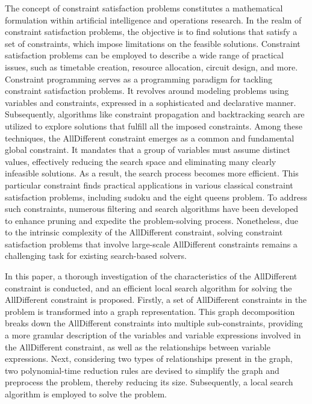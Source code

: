 The concept of constraint satisfaction problems constitutes a mathematical formulation within artificial intelligence and operations research. In the realm of constraint satisfaction problems, the objective is to find solutions that satisfy a set of constraints, which impose limitations on the feasible solutions. Constraint satisfaction problems can be employed to describe a wide range of practical issues, such as timetable creation, resource allocation, circuit design, and more. Constraint programming serves as a programming paradigm for tackling constraint satisfaction problems. It revolves around modeling problems using variables and constraints, expressed in a sophisticated and declarative manner. Subsequently, algorithms like constraint propagation and backtracking search are utilized to explore solutions that fulfill all the imposed constraints. Among these techniques, the AllDifferent constraint emerges as a common and fundamental global constraint. It mandates that a group of variables must assume distinct values, effectively reducing the search space and eliminating many clearly infeasible solutions. As a result, the search process becomes more efficient. This particular constraint finds practical applications in various classical constraint satisfaction problems, including sudoku and the eight queens problem. To address such constraints, numerous filtering and search algorithms have been developed to enhance pruning and expedite the problem-solving process. Nonetheless, due to the intrinsic complexity of the AllDifferent constraint, solving constraint satisfaction problems that involve large-scale AllDifferent constraints remains a challenging task for existing search-based solvers.

In this paper, a thorough investigation of the characteristics of the AllDifferent constraint is conducted, and an efficient local search algorithm for solving the AllDifferent constraint is proposed. Firstly, a set of AllDifferent constraints in the problem is transformed into a graph representation. This graph decomposition breaks down the AllDifferent constraints into multiple sub-constraints, providing a more granular description of the variables and variable expressions involved in the AllDifferent constraint, as well as the relationships between variable expressions. Next, considering two types of relationships present in the graph, two polynomial-time reduction rules are devised to simplify the graph and preprocess the problem, thereby reducing its size. Subsequently, a local search algorithm is employed to solve the problem.

